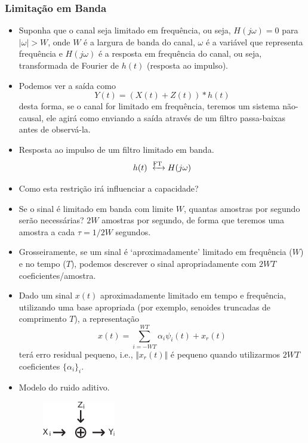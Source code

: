\begin{frame}[allowframebreaks]
  \frametitle{Limitação em Banda}
  \begin{itemize}
  \item Suponha que o canal seja limitado em frequência, ou seja, $H(j\omega) = 0$ para $\vert \omega \vert > W$,
	onde $W$ é a largura de banda do canal, $\omega$ é a variável que representa frequência e $H(j\omega)$
	é a resposta em frequência do canal, ou seja, transformada de Fourier de $h(t)$ (resposta ao impulso).
  \item Podemos ver a saída como
	\begin{equation}
	Y(t) = (X(t) + Z(t)) \ast h(t)
	\end{equation}
	desta forma, se o canal for limitado em frequência, teremos um sistema não-causal,
	ele agirá como enviando a saída através de um filtro passa-baixas antes de observá-la.
  \item Resposta ao impulso de um filtro limitado em banda.
	\begin{equation}
	h(t) \xleftrightarrow{\text{FT}} H(j\omega)
	\end{equation}
  \item Como esta restrição irá influenciar a capacidade?
  \item Se o sinal é limitado em banda com limite $W$, quantas amostras por segundo serão necessárias?
	$2W$ amostras por segundo, de forma que teremos uma amostra a cada $\tau = 1/2W$ segundos.
  \item Grosseiramente, se um sinal é `aproximadamente' limitado em frequência ($W$) e no tempo ($T$),
	podemos descrever o sinal apropriadamente com $2WT$ coeficientes/amostra.
  \item Dado um sinal $x(t)$ aproximadamente limitado em tempo e frequência, utilizando uma base apropriada
	(por exemplo, senoides truncadas de comprimento $T$), a representação
	\begin{equation}
	x(t) = \sum_{i=-WT}^{WT} \alpha_i \psi_i(t) + x_r(t)
	\end{equation}
	terá erro residual pequeno, i.e., $\Vert x_r(t) \Vert$ é pequeno quando utilizarmos $2WT$
	coeficientes $\{\alpha_i\}_i$.
  \item Modelo do ruido aditivo.
        \begin{figure}[h!]
        \centering
        \includegraphics[width=0.3\textwidth]{images/channeladdnoisemodel2.pdf}

\end{figure}
\end{itemize}
\end{frame}
